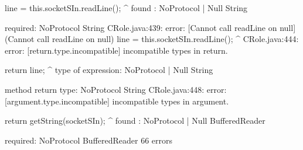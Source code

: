 \begin{code}
            line = this.socketSIn.readLine();
                                          ^
  found   : NoProtocol | Null String

  required: NoProtocol String
CRole.java:439: error: [Cannot call readLine on null] (Cannot call readLine on null)
            line = this.socketSIn.readLine();
                                          ^
CRole.java:444: error: [return.type.incompatible] incompatible types in return.

        return line;
               ^
  type of expression: NoProtocol | Null String

  method return type: NoProtocol String
CRole.java:448: error: [argument.type.incompatible] incompatible types in argument.

        return getString(socketSIn);
                         ^
  found   : NoProtocol | Null BufferedReader

  required: NoProtocol BufferedReader
66 errors
\end{code}

